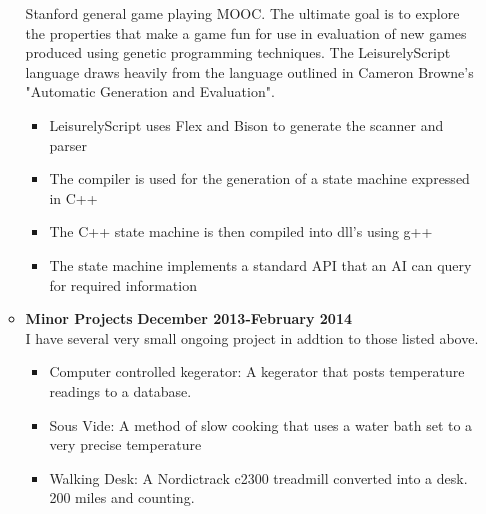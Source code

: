 \documentclass[overlapped]{res}
\begin{document}
\begin{resume}
\begin{itemize}[leftmargin=0in]
\begin{itemize}[leftmargin=0in]
\begin{samepage}
                    Stanford general game playing MOOC. The ultimate goal is to explore the properties that make a game
                    fun for use in evaluation of new games produced using genetic programming techniques. 
                    The LeisurelyScript language draws heavily from the language 
                    outlined in Cameron Browne's "Automatic Generation and Evaluation".
                    \begin{itemize}
                        \item[\textbullet] LeisurelyScript uses Flex and Bison to generate the scanner and parser
                        \item[\textbullet] The compiler is used for the generation of a state machine expressed in C++
                        \item[\textbullet] The C++ state machine is then compiled into dll's using g++
                        \item[\textbullet] The state machine implements a standard API that an AI can query for required information
                    \end{itemize}
                \end{samepage}
            \item[] 
                \begin{samepage}
                    \textbf{Minor Projects} \hfill \textbf{December 2013-February 2014} \\
                    I have several very small ongoing project in addtion to those listed above.
                    \begin{itemize}
                        \item[\textbullet] Computer controlled kegerator:  A kegerator that posts temperature readings to a database.
                        \item[\textbullet] Sous Vide:  A method of slow cooking that uses a water bath set to a very precise temperature
                        \item[\textbullet] Walking Desk:  A Nordictrack c2300 treadmill converted into a desk. 200 miles and counting.
                    \end{itemize}
                \end{samepage}
        \end{itemize}
\end{itemize}
\vspace{0.25in}


\end{resume}
\end{document}
